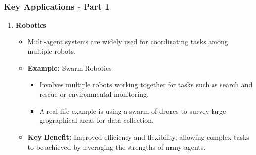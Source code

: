 \documentclass[aspectratio=169]{beamer}
\begin{document}
\begin{frame}[fragile]
    \frametitle{Key Applications - Part 1}
    \begin{enumerate}
        \item \textbf{Robotics}
        \begin{itemize}
            \item Multi-agent systems are widely used for coordinating tasks among multiple robots.
            \item \textbf{Example:} Swarm Robotics
                \begin{itemize}
                    \item Involves multiple robots working together for tasks such as search and rescue or environmental monitoring.
                    \item A real-life example is using a swarm of drones to survey large geographical areas for data collection.
                \end{itemize}
            \item \textbf{Key Benefit:} Improved efficiency and flexibility, allowing complex tasks to be achieved by leveraging the strengths of many agents.
        \end{itemize}
    \end{enumerate}
\end{frame}
\end{document}
